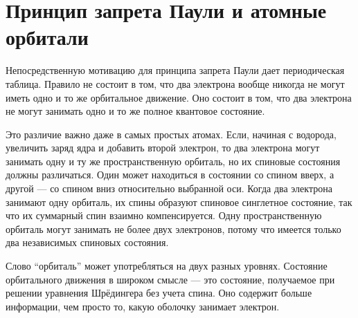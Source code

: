 \section{Принцип запрета Паули и атомные орбитали}

Непосредственную мотивацию для принципа запрета Паули дает периодическая таблица. Правило не состоит в том, что два электрона вообще никогда не могут иметь одно и то же орбитальное движение. Оно состоит в том, что два электрона не могут занимать одно и то же полное квантовое состояние.

Это различие важно даже в самых простых атомах. Если, начиная с водорода, увеличить заряд ядра и добавить второй электрон, то два электрона могут занимать одну и ту же пространственную орбиталь, но их спиновые состояния должны различаться. Один может находиться в состоянии со спином вверх, а другой — со спином вниз относительно выбранной оси. Когда два электрона занимают одну орбиталь, их спины образуют спиновое синглетное состояние, так что их суммарный спин взаимно компенсируется. Одну пространственную орбиталь могут занимать не более двух электронов, потому что имеется только два независимых спиновых состояния.

\begin{classroomqa}
\end{classroomqa}

Слово ``орбиталь'' может употребляться на двух разных уровнях. Состояние орбитального движения в широком смысле — это состояние, получаемое при решении уравнения Шрёдингера без учета спина. Оно содержит больше информации, чем просто то, какую оболочку занимает электрон.

\begin{classroomqa}
\end{classroomqa}

